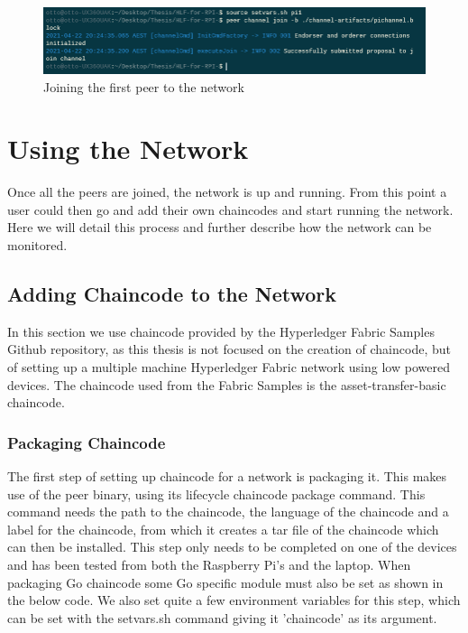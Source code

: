 \begin{figure}[h]
    \centering
    \includegraphics{pi1join.PNG}
    \caption{Joining the first peer to the network}
    \label{fig:my_label}
\end{figure}


\section{Using the Network}

Once all the peers are joined, the network is up and running. From this point a user could then go and add their own chaincodes and start running the network. Here we will detail this process and further describe how the network can be monitored.

\subsection{Adding Chaincode to the Network}

In this section we use chaincode provided by the Hyperledger Fabric Samples Github repository, as this thesis is not focused on the creation of chaincode, but of setting up a multiple machine Hyperledger Fabric network using low powered devices. The chaincode used from the Fabric Samples is the asset-transfer-basic chaincode.

\subsubsection{Packaging Chaincode}

The first step of setting up chaincode for a network is packaging it. This makes use of the peer binary, using its lifecycle chaincode package command. This command needs the path to the chaincode, the language of the chaincode and a label for the chaincode, from which it creates a tar file of the chaincode which can then be installed. This step only needs to be completed on one of the devices and has been tested from both the Raspberry Pi's and the laptop. When packaging Go chaincode some Go specific module must also be set as shown in the below code. We also set quite a few environment variables for this step, which can be set with the setvars.sh command giving it 'chaincode' as its argument.

